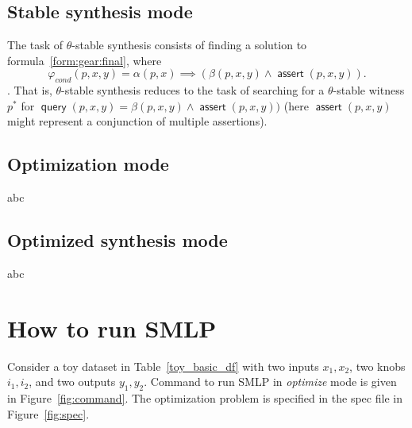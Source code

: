 \documentclass[a4paper,parskip=half]{article} %
\newcommand*\eqdef=
\newcommand*\query{\operatorname{\mathsf{query}}}
\newcommand*\assert{\operatorname{\mathsf{assert}}}
\begin{document}
\subsection{Stable synthesis mode}


The task of $\theta$-stable synthesis consists of finding a solution to formula~\cref{form:gear:final}, where
\[\varphi_{\mathit{cond}}(p,x,y) \eqdef \alpha(p,x) \implies (\beta(p, x, y) \wedge \assert(p,x,y)).\].
That is,  $\theta$-stable synthesis reduces to the task of searching for a $\theta$-stable witness $p^*$ for
$\query(p, x, y) \eqdef \beta(p, x, y) \wedge \assert(p,x,y))$ (here $\assert(p, x, y)$ might represent a conjunction of multiple assertions).



\subsection{Optimization mode}

abc


\subsection{Optimized synthesis mode}
abc



\section{How to run SMLP}\label{sec:run}


Consider a toy dataset in Table~\cref{toy_basic_df} with two inputs $x_1, x_2$, two knobs $i_1, i_2$, and two outputs $y_1, y_2$.
Command to run SMLP in \emph{optimize} mode is given in Figure~\cref{fig:command}.
The optimization problem is specified in the spec file in Figure~\cref{fig:spec}.
\end{document}
